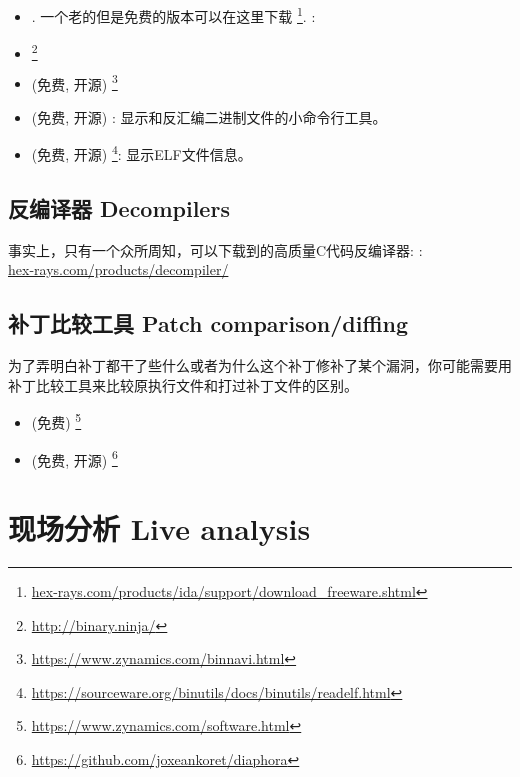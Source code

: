 \documentclass[UTF8,nofonts]{ctexart}
\begin{document}

\begin{itemize}
\item {}. 一个老的但是免费的版本可以在这里下载
\footnote{\href{http://go.yurichev.com/17031}{hex-rays.com/products/ida/support/download\_freeware.shtml}}.
\ShortHotKeyCheatsheet: 

\item {}\footnote{\url{http://binary.ninja/}}

\item (免费, 开源) \footnote{\url{https://www.zynamics.com/binnavi.html}}

\item (免费, 开源) : 显示和反汇编二进制文件的小命令行工具。

\item (免费, 开源) \footnote{\url{https://sourceware.org/binutils/docs/binutils/readelf.html}}:
显示ELF文件信息。
\end{itemize}

\subsection{反编译器 Decompilers}

事实上，只有一个众所周知，可以下载到的高质量C代码反编译器: :\\
\href{http://go.yurichev.com/17033}{hex-rays.com/products/decompiler/}


\subsection{补丁比较工具 Patch comparison/diffing}

为了弄明白补丁都干了些什么或者为什么这个补丁修补了某个漏洞，你可能需要用补丁比较工具来比较原执行文件和打过补丁文件的区别。

\begin{itemize}
\item (免费) \footnote{\url{https://www.zynamics.com/software.html}}

\item (免费, 开源) \footnote{\url{https://github.com/joxeankoret/diaphora}}
\end{itemize}

\section{现场分析 Live analysis}
\end{document}
